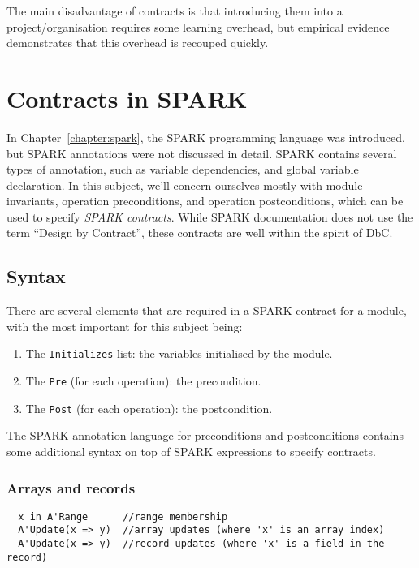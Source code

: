 The main disadvantage of contracts is that introducing them into a project/organisation requires some learning overhead, but empirical evidence demonstrates that this overhead is recouped quickly.


\section{Contracts in SPARK}

In Chapter~\ref{chapter:spark}, the SPARK programming language was introduced, but SPARK annotations were not discussed in detail. SPARK contains several types of annotation, such as variable dependencies, and global variable declaration. In this subject, we'll concern ourselves mostly with  module invariants, operation preconditions, and operation postconditions, which can be used to specify \emph{SPARK contracts}. While SPARK documentation does not use the term ``Design by Contract'', these contracts are well within the spirit of DbC.

\subsection{Syntax}

There are several elements that are required in a SPARK contract for a module, with the most important for this subject being:

\begin{enumerate}

 \item The \texttt{Initializes} list: the variables initialised by the module.

 \item The \texttt{Pre} (for each operation): the precondition.

 \item The \texttt{Post} (for each operation): the postcondition.

\end{enumerate}

The SPARK annotation language for preconditions and postconditions contains some additional syntax on top of SPARK expressions to specify contracts.

\subsubsection{Arrays and records}
\label{sec:dbc:spark:arrays-and-records}

\lstset{language=}
\begin{lstlisting}
  x in A'Range      //range membership
  A'Update(x => y)  //array updates (where 'x' is an array index)
  A'Update(x => y)  //record updates (where 'x' is a field in the record)
\end{lstlisting}

